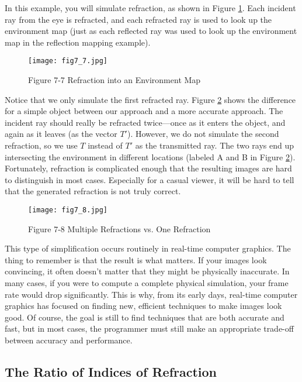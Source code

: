 \documentclass[../main.tex]{subfiles}
\begin{document}
In this example, you will simulate refraction, as shown in Figure \ref{fig:7-7}. Each incident ray from the eye is refracted, and each refracted ray is used to look up the environment map (just as each reflected ray was used to look up the environment map in the reflection mapping example).

\begin{figure}
    \centering
    \texttt{[image: fig7\_7.jpg]}
    \caption{Figure 7-7 Refraction into an Environment Map}
    \label{fig:7-7}
\end{figure}

Notice that we only simulate the first refracted ray. Figure \ref{fig:7-8} shows the difference for a simple object between our approach and a more accurate approach. The incident ray should really be refracted twice—once as it enters the object, and again as it leaves (as the vector $T'$). However, we do not simulate the second refraction, so we use $T$ instead of $T'$ as the transmitted ray. The two rays end up intersecting the environment in different locations (labeled A and B in Figure \ref{fig:7-8}). Fortunately, refraction is complicated enough that the resulting images are hard to distinguish in most cases. Especially for a casual viewer, it will be hard to tell that the generated refraction is not truly correct.

\begin{figure}
    \centering
    \texttt{[image: fig7\_8.jpg]}
    \caption{Figure 7-8 Multiple Refractions vs. One Refraction}
    \label{fig:7-8}
\end{figure}

This type of simplification occurs routinely in real-time computer graphics. The thing to remember is that the result is what matters. If your images look convincing, it often doesn't matter that they might be physically inaccurate. In many cases, if you were to compute a complete physical simulation, your frame rate would drop significantly. This is why, from its early days, real-time computer graphics has focused on finding new, efficient techniques to make images look good. Of course, the goal is still to find techniques that are both accurate and fast, but in most cases, the programmer must still make an appropriate trade-off between accuracy and performance.

\subsection*{The Ratio of Indices of Refraction}
\end{document}
